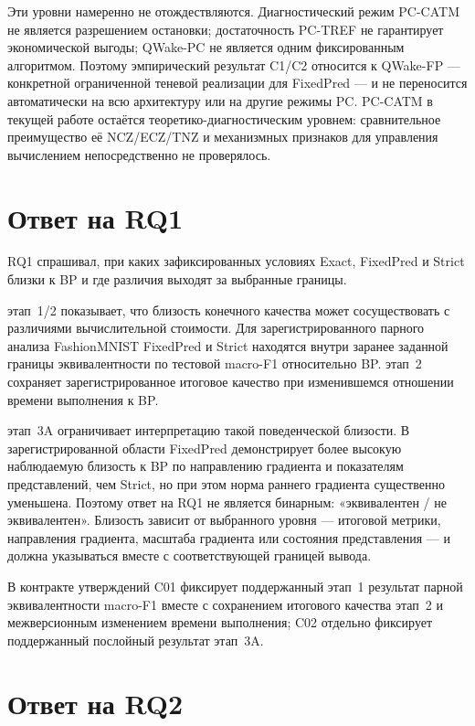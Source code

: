 Эти уровни намеренно не отождествляются. Диагностический режим PC-CATM не
является разрешением остановки; достаточность PC-TREF не гарантирует
экономической выгоды; QWake-PC не является одним фиксированным алгоритмом.
Поэтому эмпирический результат C1/C2 относится к QWake-FP --- конкретной
ограниченной теневой реализации для FixedPred --- и не переносится
автоматически на всю архитектуру или на другие режимы PC. PC-CATM в текущей
работе остаётся теоретико-диагностическим уровнем: сравнительное преимущество её
NCZ/ECZ/TNZ и механизмных признаков для управления вычислением непосредственно
не проверялось.

\section{Ответ на RQ1}
\label{sec:conclusion-rq1}

RQ1 спрашивал, при каких зафиксированных условиях Exact, FixedPred и Strict
близки к BP и где различия выходят за выбранные границы.

этап~1/2 показывает, что близость конечного качества может сосуществовать с
различиями вычислительной стоимости. Для зарегистрированного парного анализа
FashionMNIST FixedPred и Strict находятся внутри заранее заданной границы
эквивалентности по тестовой macro-F1 относительно BP. этап~2 сохраняет
зарегистрированное итоговое качество при изменившемся отношении времени
выполнения к BP.

этап~3A ограничивает интерпретацию такой поведенческой близости. В
зарегистрированной области FixedPred демонстрирует более высокую наблюдаемую
близость к BP по направлению градиента и показателям представлений, чем Strict,
но при этом норма раннего градиента
существенно уменьшена. Поэтому ответ на RQ1 не является бинарным:
«эквивалентен / не эквивалентен». Близость зависит от выбранного уровня ---
итоговой метрики, направления градиента, масштаба градиента или состояния
представления --- и должна указываться вместе с соответствующей границей
вывода.

В контракте утверждений C01 фиксирует поддержанный этап~1 результат парной
эквивалентности macro-F1 вместе с сохранением итогового качества этап~2 и
межверсионным изменением времени выполнения; C02 отдельно фиксирует
поддержанный послойный результат этап~3A.

\section{Ответ на RQ2}
\label{sec:conclusion-rq2}

